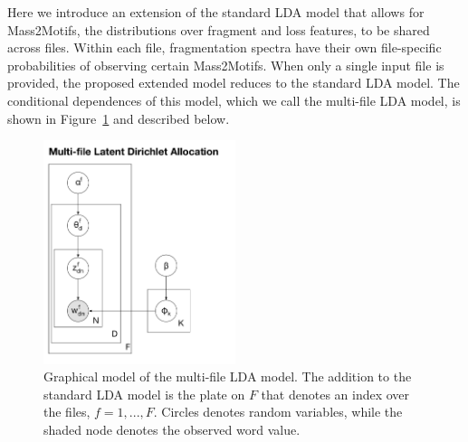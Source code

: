 Here we introduce an extension of the standard LDA model that allows for Mass2Motifs, the distributions over fragment and loss features, to be shared across files. Within each file, fragmentation spectra have their own file-specific probabilities of observing certain Mass2Motifs. When only a single input file is provided, the proposed extended model reduces to the standard LDA model. The conditional dependences of this model, which we call the multi-file LDA model, is shown in Figure~\ref{fig:lda-multifile-lda-diagram} and described below.

\begin{figure}[tbh!]
\noindent \begin{centering}
\includegraphics[width=0.5\textwidth]{07-lda/figures/multifile_lda.pdf}
\par\end{centering}
\caption[Graphical model of the multi-file LDA model.]{\label{fig:lda-multifile-lda-diagram}Graphical model of the multi-file LDA model. The addition to the standard LDA model is the plate on $F$ that denotes an index over the files, $f=1,...,F$. Circles denotes random variables, while the shaded node denotes the observed word value.}
\end{figure}

